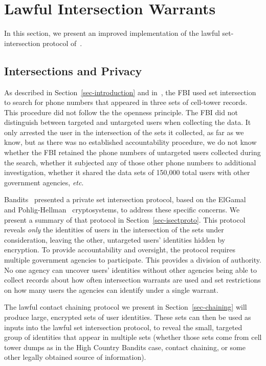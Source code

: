 \section{Lawful Intersection Warrants}\label{sec-intersection}
In this section, we present an improved implementation of the lawful
set-intersection protocol of~\cite{sff-foci2014}. 
\subsection{Intersections and Privacy}

As described in Section~\ref{sec-introduction} and in~\cite{sff-foci2014}, the FBI used
set intersection to search for phone numbers that appeared in three sets of
cell-tower records. This procedure did not follow the the openness principle.
The FBI did not distinguish between targeted and untargeted users when
collecting the data. It only arrested the user in the intersection of the sets
it collected, as far as we know, but as there was no established accountability
procedure, we do not know whether the FBI retained the phone numbers of
untargeted users collected during the search, whether it subjected any of those
other phone numbers to additional investigation, whether it shared the data sets
of 150,000 total users with other government agencies, \emph{etc}. 

Bandits~\cite{sff-foci2014} presented a private set intersection
protocol, based on the ElGamal~\cite{elgamal} and Pohlig-Hellman~\cite{pohlighellman}
cryptosystems, to address these specific concerns. We present a summary of that protocol
in Section~\ref{sec-isectproto}. This protocol reveals \emph{only} the identities
of users in the intersection of the sets under consideration, leaving the other,
untargeted users' identities hidden by encryption. To provide accountability and
oversight, the protocol requires multiple government agencies to participate. This
provides a division of authority. No one agency can uncover users' identities
without other agencies being able to collect records about how often intersection
warrants are used and set restrictions on how many users the agencies can identify
under a single warrant.

The lawful contact chaining protocol we present in Section~\ref{sec-chaining} will
produce large, encrypted sets of user identities. These sets can then be used as
inputs into the lawful set intersection protocol, to reveal the small, targeted
group of identities that appear in multiple sets (whether those sets come from cell
tower dumps as in the High Country Bandits case, contact chaining, or some other
legally obtained source of information). 

